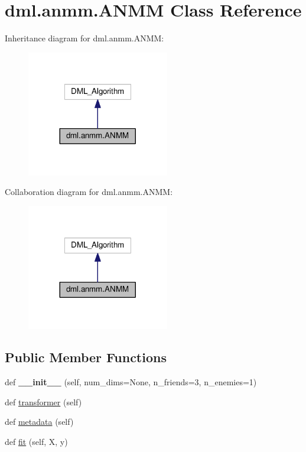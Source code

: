 \hypertarget{classdml_1_1anmm_1_1ANMM}{}\section{dml.\+anmm.\+A\+N\+MM Class Reference}
\label{classdml_1_1anmm_1_1ANMM}


Inheritance diagram for dml.\+anmm.\+A\+N\+MM\+:
\nopagebreak
\begin{figure}[H]
\begin{center}
\leavevmode
\includegraphics[width=176pt]{classdml_1_1anmm_1_1ANMM__inherit__graph}
\end{center}
\end{figure}


Collaboration diagram for dml.\+anmm.\+A\+N\+MM\+:
\nopagebreak
\begin{figure}[H]
\begin{center}
\leavevmode
\includegraphics[width=176pt]{classdml_1_1anmm_1_1ANMM__coll__graph}
\end{center}
\end{figure}
\subsection*{Public Member Functions}
\begin{DoxyCompactItemize}
\item 
def {\bfseries \+\_\+\+\_\+init\+\_\+\+\_\+} (self, num\+\_\+dims=None, n\+\_\+friends=3, n\+\_\+enemies=1)\hypertarget{classdml_1_1anmm_1_1ANMM_abb2f1eacd76c294cd6bf76a8dcbfc388}{}\label{classdml_1_1anmm_1_1ANMM_abb2f1eacd76c294cd6bf76a8dcbfc388}

\item 
def \hyperlink{classdml_1_1anmm_1_1ANMM_a186d5fb3101c64747b75bdd5ae3f2ed5}{transformer} (self)
\item 
def \hyperlink{classdml_1_1anmm_1_1ANMM_af502f88ac840c080244c1d34e89f2aee}{metadata} (self)
\item 
def \hyperlink{classdml_1_1anmm_1_1ANMM_a251aa849680050f1e1a2af4e22bf6cbf}{fit} (self, X, y)
\end{DoxyCompactItemize}
